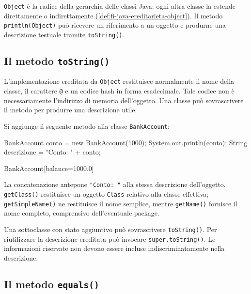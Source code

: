 \texttt{Object} è la radice della gerarchia delle classi Java:
ogni altra classe la estende direttamente o indirettamente
(\cref{def:fi-java-ereditarieta-object}).
Il metodo \texttt{println(Object)} può ricevere un riferimento
a un oggetto e produrne una descrizione testuale tramite
\texttt{toString()}.

\subsection{Il metodo \texttt{toString()}}
\label{sec:fi-java-interfacce-tostring}

L'implementazione ereditata da \texttt{Object} restituisce
normalmente il nome della classe, il carattere \texttt{@} e un
codice hash in forma esadecimale. Tale codice non è
necessariamente l'indirizzo di memoria dell'oggetto. Una classe
può sovrascrivere il metodo per produrre una descrizione utile.

\begin{example}
Si aggiunge il seguente metodo alla classe \texttt{BankAccount}:



\begin{unipdcode}[language=Java]
BankAccount conto = new BankAccount(1000);
System.out.println(conto);
String descrizione = "Conto: " + conto;
\end{unipdcode}

\begin{unipdterminal}
BankAccount[balance=1000.0]
\end{unipdterminal}

La concatenazione antepone \texttt{"Conto: "} alla stessa
descrizione dell'oggetto.
\texttt{getClass()} restituisce un oggetto \texttt{Class}
relativo alla classe effettiva; \texttt{getSimpleName()} ne
restituisce il nome semplice, mentre \texttt{getName()} fornisce
il nome completo, comprensivo dell'eventuale package.
\end{example}

Una sottoclasse con stato aggiuntivo può sovrascrivere
\texttt{toString()}. Per riutilizzare la descrizione ereditata
può invocare \texttt{super.toString()}.
Le informazioni riservate non devono essere incluse
indiscriminatamente nella descrizione.

\subsection{Il metodo \texttt{equals()}}
\label{sec:fi-java-interfacce-equals}

